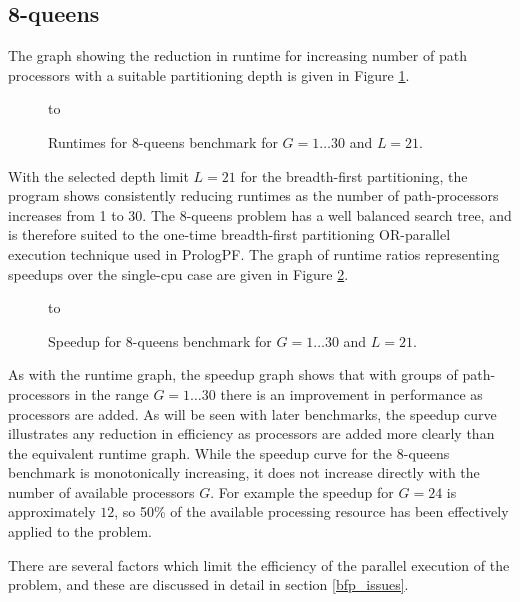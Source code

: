 \subsection{8-queens}

The graph showing the reduction in runtime for increasing number of 
path processors with a suitable partitioning depth is given in Figure \ref{queens8_cut_c_L_21}.

\begin{figure}[htb]
\vspace{5mm} \hbox to 
\caption{Runtimes for 8-queens benchmark for $G=1\ldots 30$ and $L=21$.}
\vspace{5mm}
\label{queens8_cut_c_L_21}
\end{figure}

With the selected depth limit $L=21$ for the breadth-first
partitioning, the program shows consistently reducing runtimes as the
number of path-processors increases from 1 to 30.  The 8-queens
problem has a well balanced search tree, and is therefore suited to
the one-time breadth-first partitioning OR-parallel execution technique used in PrologPF.
The graph of runtime ratios representing
speedups over the single-cpu case are given in Figure \ref{q8_cut_c_L_21_spdup}.

\begin{figure}[htb]
\vspace{5mm} \hbox to 
\caption{Speedup for 8-queens benchmark for $G=1\ldots 30$ and $L=21$.}
\vspace{5mm}
\label{q8_cut_c_L_21_spdup}
\end{figure}

As with the runtime graph, the speedup graph shows that with groups of
path-processors in the range $G=1\ldots 30$ there is an improvement in
performance as processors are added.  As will be seen with later
benchmarks, the speedup curve illustrates any reduction in efficiency
as processors are added more clearly than the equivalent runtime
graph.  While the speedup curve for the 8-queens benchmark is
monotonically increasing, it does not increase directly with the
number of available processors $G$.  For example the speedup for
$G=24$ is approximately $12$, so 50\% of the available processing
resource has been effectively applied to the problem.

There are several factors which limit the efficiency of the parallel
execution of the problem, and these are discussed in detail in section
\ref{bfp_issues}.

